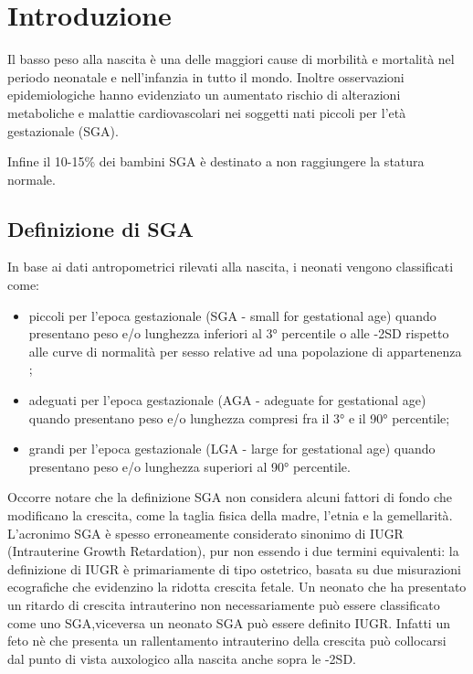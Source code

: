 \mainmatter

\chapter{Introduzione}
 
Il basso peso alla nascita \`e una delle maggiori cause di morbilit\`a e mortalit\`a
nel periodo neonatale e nell'infanzia in tutto il mondo.
Inoltre osservazioni epidemiologiche hanno evidenziato un aumentato rischio di 
alterazioni metaboliche e malattie cardiovascolari nei soggetti nati piccoli 
per l'et\`a gestazionale (SGA)\cite{consensus}.

Infine il 10-15\% dei bambini SGA è destinato a non raggiungere la statura normale\cite{sga}.

\section{Definizione di SGA}

In base ai dati antropometrici rilevati alla nascita, i neonati vengono classificati come:
\begin{itemize}
\item piccoli per l'epoca gestazionale (SGA - small for gestational age) quando presentano peso e/o lunghezza inferiori al 3°
   percentile o alle -2SD rispetto alle curve di normalità per sesso relative ad una popolazione di appartenenza ;
\item adeguati per l'epoca gestazionale (AGA - adeguate for gestational age) quando presentano peso e/o lunghezza compresi
   fra il 3° e il 90° percentile;
\item grandi per l'epoca gestazionale (LGA - large for gestational age) quando presentano peso e/o lunghezza superiori
   al 90° percentile\cite{sga-1}.
\end{itemize}

Occorre notare che la definizione SGA non considera alcuni fattori di fondo che modificano la crescita, come la taglia fisica della madre,
l'etnia e la gemellarit\`a\cite{consensus}.
L'acronimo SGA è spesso erroneamente considerato sinonimo di IUGR (Intrauterine Growth Retardation), pur non essendo i due termini
equivalenti\cite{sga}: la definizione di IUGR è primariamente di tipo ostetrico, basata su due misurazioni ecografiche che evidenzino la ridotta crescita fetale\cite{consensus}.
Un neonato che ha presentato un ritardo di crescita intrauterino non necessariamente pu\`o essere classificato come uno SGA,viceversa un
neonato SGA pu\`o essere definito IUGR. Infatti un feto n\`e  che presenta un rallentamento intrauterino della crescita può collocarsi dal punto di vista 
auxologico alla nascita anche sopra le -2SD\cite{sga}.

